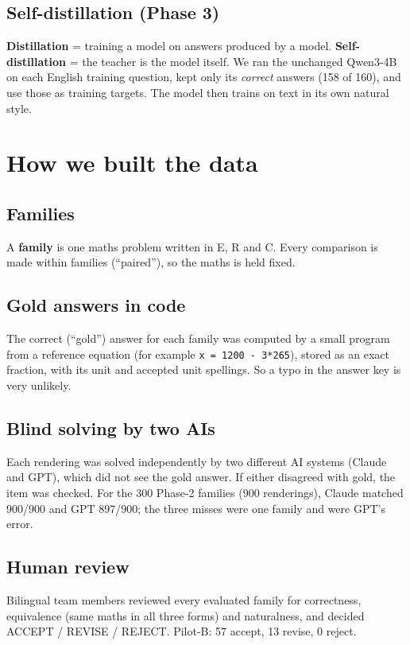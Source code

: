 \documentclass[11pt,a4paper]{article}
\begin{document}
\subsection{Self-distillation (Phase 3)}
\textbf{Distillation} = training a model on answers produced by a model. \textbf{Self-distillation} = the teacher is the model itself. We ran the unchanged Qwen3-4B on each English training question, kept only its \emph{correct} answers (158 of 160), and use those as training targets. The model then trains on text in its own natural style.

\section{How we built the data}

\subsection{Families}
A \textbf{family} is one maths problem written in E, R and C. Every comparison is made within families (``paired''), so the maths is held fixed.

\subsection{Gold answers in code}
The correct (``gold'') answer for each family was computed by a small program from a reference equation (for example \texttt{x = 1200 - 3*265}), stored as an exact fraction, with its unit and accepted unit spellings. So a typo in the answer key is very unlikely.

\subsection{Blind solving by two AIs}
Each rendering was solved independently by two different AI systems (Claude and GPT), which did not see the gold answer. If either disagreed with gold, the item was checked. For the 300 Phase-2 families (900 renderings), Claude matched 900/900 and GPT 897/900; the three misses were one family and were GPT's error.

\subsection{Human review}
Bilingual team members reviewed every evaluated family for correctness, equivalence (same maths in all three forms) and naturalness, and decided ACCEPT / REVISE / REJECT. Pilot-B: 57 accept, 13 revise, 0 reject.
\end{document}
